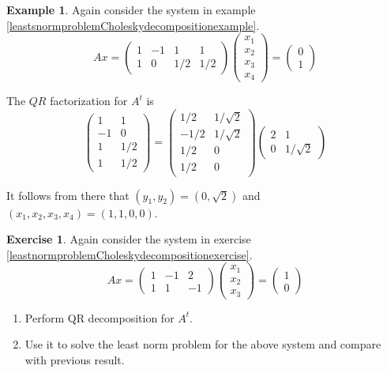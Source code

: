 \documentclass[12pt]{amsart}
\theoremstyle{definition}
\newtheorem{example}[theorem]{Example}
\newtheorem{exercise}[theorem]{Exercise}
\begin{document}
\begin{example}\label{leastsnormproblemQRdecompositionexample} Again consider the system in example \ref{leastsnormproblemCholeskydecompositionexample}.
$$Ax = \left(\begin{array}{cccc} 1 & -1 & 1 & 1 \\ 1 & 0 & 1/2 & 1/2 \end{array} \right)\left(\begin{array}{c} x_1 \\ x_2 \\ x_3 \\ x_4 \end{array}\right) = \left(\begin{array}{c} 0 \\ 1\end{array}\right)$$

The $QR$ factorization for $A^t$ is
$$\left(\begin{array}{cc} 1 & 1 \\ -1 & 0 \\ 1 & 1/2 \\ 1 & 1/2 \end{array}\right) = \left(\begin{array}{cc} 1/2 & 1/ \sqrt{2} \\ -1/2 & 1/ \sqrt{2} \\ 1/2 & 0 \\ 1/2 & 0 \end{array}\right) \left(\begin{array}{cc} 2 & 1 \\ 0 & 1/ \sqrt{2} \end{array}\right)$$

It follows from there that $(y_1, y_2) = (0, \sqrt{2})$ and $(x_1, x_2, x_3, x_4) = (1,1,0,0)$.
\end{example}

\begin{exercise}\label{leastsnormproblemQRdecompositionexercise} Again consider the system in exercise \ref{leastnormproblemCholeskydecompositionexercise}.
$$Ax = \left(\begin{array}{ccc} 1 & -1 & 2 \\ 1 & 1 & -1 \end{array}\right) \left(\begin{array}{c} x_1 \\ x_2 \\ x_3 \end{array}\right) = \left(\begin{array}{c} 1 \\ 0 \end{array}\right)$$
\begin{enumerate}[\indent a.]
\item Perform QR decomposition for $A^t$.
\item Use it to solve the least norm problem for the above system and compare with previous result.
\end{enumerate}
\end{exercise}

\end{document}
